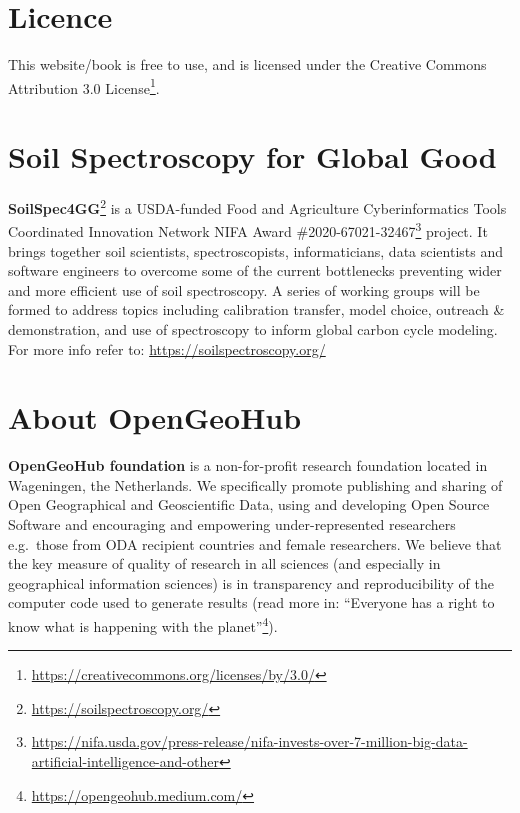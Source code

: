 \documentclass[
  graybox,natbib,nospthms]{svmono}
\renewcommand{\href}[2]{#2 (\url{#1})}
\renewcommand{\href}[2]{#2\footnote{\url{#1}}}
\begin{document}
\hypertarget{licence}{%
\section{Licence}\label{licence}}

This website/book is free to use, and is licensed under the \href{https://creativecommons.org/licenses/by/3.0/}{Creative
Commons Attribution 3.0
License}.

\hypertarget{soil-spectroscopy-for-global-good}{%
\section{Soil Spectroscopy for Global Good}\label{soil-spectroscopy-for-global-good}}

\href{https://soilspectroscopy.org/}{\textbf{SoilSpec4GG}} is a USDA-funded \href{https://nifa.usda.gov/press-release/nifa-invests-over-7-million-big-data-artificial-intelligence-and-other}{Food and Agriculture Cyberinformatics
Tools Coordinated Innovation Network NIFA Award \#2020-67021-32467} project. It brings together soil
scientists, spectroscopists, informaticians, data scientists and
software engineers to overcome some of the current bottlenecks
preventing wider and more efficient use of soil spectroscopy. A series
of working groups will be formed to address topics including calibration
transfer, model choice, outreach \& demonstration, and use of
spectroscopy to inform global carbon cycle modeling. For more info refer
to: \url{https://soilspectroscopy.org/}

\hypertarget{about-opengeohub}{%
\section{About OpenGeoHub}\label{about-opengeohub}}

\textbf{OpenGeoHub foundation} is a non-for-profit research foundation
located in Wageningen, the Netherlands. We specifically promote
publishing and sharing of Open Geographical and Geoscientific Data,
using and developing Open Source Software and encouraging and empowering
under-represented researchers e.g.~those from ODA recipient countries
and female researchers. We believe that the key measure of quality of
research in all sciences (and especially in geographical information
sciences) is in transparency and reproducibility of the computer code
used to generate results (read more in: \href{https://opengeohub.medium.com/}{``Everyone has a right to know
what is happening with the planet''}).
\end{document}
